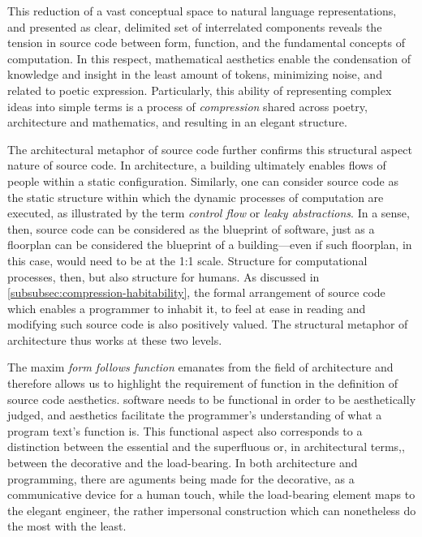 This reduction of a vast conceptual space to natural language representations, and presented as clear, delimited set of interrelated components reveals the tension in source code between form, function, and the fundamental concepts of computation. In this respect, mathematical aesthetics enable the condensation of knowledge and insight in the least amount of tokens, minimizing noise, and related to poetic expression. Particularly, this ability of representing complex ideas into simple terms is a process of \emph{compression} shared across poetry, architecture and mathematics, and resulting in an elegant structure.

The architectural metaphor of source code further confirms this structural aspect nature of source code. In architecture, a building ultimately enables flows of people within a static configuration. Similarly, one can consider source code as the static structure within which the dynamic processes of computation are executed, as illustrated by the term \emph{control flow} or \emph{leaky abstractions}. In a sense, then, source code can be considered as the blueprint of software, just as a floorplan can be considered the blueprint of a building—even if such floorplan, in this case, would need to be at the 1:1 scale. Structure for computational processes, then, but also structure for humans. As discussed in \ref{subsubsec:compression-habitability}, the formal arrangement of source code which enables a programmer to inhabit it, to feel at ease in reading and modifying such source code is also positively valued. The structural metaphor of architecture thus works at these two levels.

The maxim \emph{form follows function} emanates from the field of architecture and therefore allows us to highlight the requirement of function in the definition of source code aesthetics. software needs to be functional in order to be aesthetically judged, and aesthetics facilitate the programmer's understanding of what a program text's function is. This functional aspect also corresponds to a distinction between the essential and the superfluous or, in architectural terms,, between the decorative and the load-bearing. In both architecture and programming, there are aguments being made for the decorative, as a communicative device for a human touch, while the load-bearing element maps to the elegant engineer, the rather impersonal construction which can nonetheless do the most with the least.

